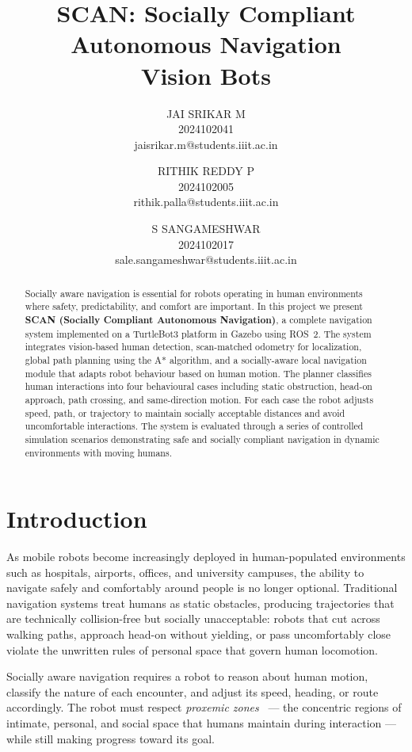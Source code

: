\documentclass[a4paper]{article}
\title{SCAN: Socially Compliant Autonomous Navigation\\
Vision Bots}
\author{
JAI SRIKAR M \\ 2024102041 \\
jaisrikar.m@students.iiit.ac.in \\
\and
RITHIK REDDY P \\ 2024102005 \\
rithik.palla@students.iiit.ac.in \\
\and
S SANGAMESHWAR \\ 2024102017 \\
sale.sangameshwar@students.iiit.ac.in \\
}
\begin{document}
\maketitle
\thispagestyle{empty}


\begin{abstract}
Socially aware navigation is essential for robots operating in human environments where safety, predictability, and comfort are important. In this project we present \textbf{SCAN (Socially Compliant Autonomous Navigation)}, a complete navigation system implemented on a TurtleBot3 platform in Gazebo using ROS~2. The system integrates vision-based human detection, scan-matched odometry for localization, global path planning using the A* algorithm, and a socially-aware local navigation module that adapts robot behaviour based on human motion. The planner classifies human interactions into four behavioural cases including static obstruction, head-on approach, path crossing, and same-direction motion. For each case the robot adjusts speed, path, or trajectory to maintain socially acceptable distances and avoid uncomfortable interactions. The system is evaluated through a series of controlled simulation scenarios demonstrating safe and socially compliant navigation in dynamic environments with moving humans.
\end{abstract}


\section{Introduction}

As mobile robots become increasingly deployed in human-populated environments such as hospitals, airports, offices, and university campuses, the ability to navigate safely and comfortably around people is no longer optional. Traditional navigation systems treat humans as static obstacles, producing trajectories that are technically collision-free but socially unacceptable: robots that cut across walking paths, approach head-on without yielding, or pass uncomfortably close violate the unwritten rules of personal space that govern human locomotion.

Socially aware navigation requires a robot to reason about human motion, classify the nature of each encounter, and adjust its speed, heading, or route accordingly. The robot must respect \textit{proxemic zones}~\cite{hall1966hidden} --- the concentric regions of intimate, personal, and social space that humans maintain during interaction --- while still making progress toward its goal.
\end{document}
